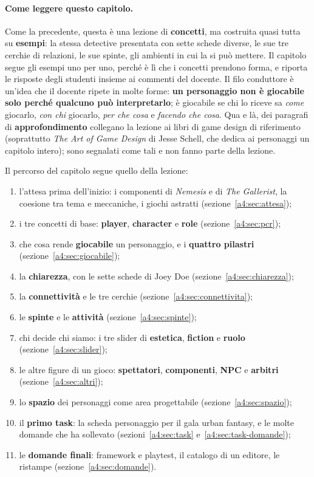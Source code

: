\paragraph{Come leggere questo capitolo.} Come la precedente, questa è una lezione
di \textbf{concetti}, ma costruita quasi tutta su \textbf{esempi}: la stessa
detective presentata con sette schede diverse, le sue tre cerchie di relazioni, le
sue spinte, gli ambienti in cui la si può mettere. Il capitolo segue gli esempi
uno per uno, perché è lì che i concetti prendono forma, e riporta le risposte
degli studenti insieme ai commenti del docente. Il filo conduttore è un'idea che
il docente ripete in molte forme: \textbf{un personaggio non è giocabile solo
perché qualcuno può interpretarlo}; è giocabile se chi lo riceve sa \emph{come}
giocarlo, \emph{con chi} giocarlo, \emph{per che cosa} e \emph{facendo che cosa}.
Qua e là, dei paragrafi di \textbf{approfondimento} collegano la lezione ai libri
di game design di riferimento (soprattutto \emph{The Art of Game Design} di Jesse
Schell, che dedica ai personaggi un capitolo intero); sono segnalati come tali e
non fanno parte della lezione.

Il percorso del capitolo segue quello della lezione:
\begin{enumerate}
  \item l'attesa prima dell'inizio: i componenti di \emph{Nemesis} e di
        \emph{The Gallerist}, la coesione tra tema e meccaniche, i giochi
        astratti (sezione~\ref{a4:sec:attesa});
  \item i tre concetti di base: \textbf{player}, \textbf{character} e
        \textbf{role} (sezione~\ref{a4:sec:pcr});
  \item che cosa rende \textbf{giocabile} un personaggio, e i \textbf{quattro
        pilastri} (sezione~\ref{a4:sec:giocabile});
  \item la \textbf{chiarezza}, con le sette schede di Joey Doe
        (sezione~\ref{a4:sec:chiarezza});
  \item la \textbf{connettività} e le tre cerchie
        (sezione~\ref{a4:sec:connettivita});
  \item le \textbf{spinte} e le \textbf{attività}
        (sezione~\ref{a4:sec:spinte});
  \item chi decide chi siamo: i tre slider di \textbf{estetica},
        \textbf{fiction} e \textbf{ruolo} (sezione~\ref{a4:sec:slider});
  \item le altre figure di un gioco: \textbf{spettatori}, \textbf{componenti},
        \textbf{NPC} e \textbf{arbitri} (sezione~\ref{a4:sec:altri});
  \item lo \textbf{spazio} dei personaggi come area progettabile
        (sezione~\ref{a4:sec:spazio});
  \item il \textbf{primo task}: la scheda personaggio per il gala urban fantasy,
        e le molte domande che ha sollevato (sezioni~\ref{a4:sec:task}
        e~\ref{a4:sec:task-domande});
  \item le \textbf{domande finali}: framework e playtest, il catalogo di un
        editore, le ristampe (sezione~\ref{a4:sec:domande}).
\end{enumerate}

